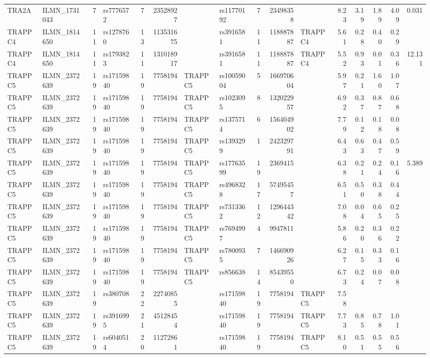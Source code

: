\documentclass{article}
\begin{document}
\begin{landscape}
{\begin{ThreePartTable}
\begin{longtable}{|llr|lrrl|lrrl|rrrr|r|}
TRA2A & ILMN\_1731043 & 7 & rs7776572 & 7 & 23528927 &  & rs11770192 & 7 & 23498358 &  & 8.23 & 3.19 & 1.89 & 4.09 & 0.031 \\
TRAPPC4 & ILMN\_1814650 & 11 & rs1278760 & 13 & 113531675 &  & rs3916581 & 11 & 118887887 & TRAPPC4 & 5.61 & 0.28 & 0.40 & 0.29 &  \\
TRAPPC4 & ILMN\_1814650 & 11 & rs1793823 & 11 & 131018917 &  & rs3916581 & 11 & 118887887 & TRAPPC4 & 5.52 & 0.93 & 0.01 & 0.36 & 12.131 \\
TRAPPC5 & ILMN\_2372639 & 19 & rs17159840 & 19 & 7758194 & TRAPPC5 & rs10059004 & 5 & 166970604 &  & 5.97 & 0.21 & 1.60 & 1.07 &  \\
TRAPPC5 & ILMN\_2372639 & 19 & rs17159840 & 19 & 7758194 & TRAPPC5 & rs1023095 & 8 & 132022957 &  & 6.92 & 0.37 & 0.87 & 0.68 &  \\
TRAPPC5 & ILMN\_2372639 & 19 & rs17159840 & 19 & 7758194 & TRAPPC5 & rs1375714 & 6 & 156404902 &  & 7.79 & 0.12 & 0.18 & 0.08 &  \\
TRAPPC5 & ILMN\_2372639 & 19 & rs17159840 & 19 & 7758194 & TRAPPC5 & rs1393299 & 1 & 242329791 &  & 6.43 & 0.63 & 0.47 & 0.59 &  \\
TRAPPC5 & ILMN\_2372639 & 19 & rs17159840 & 19 & 7758194 & TRAPPC5 & rs17763599 & 19 & 2369415 &  & 6.38 & 0.21 & 0.24 & 0.16 & 5.389 \\
TRAPPC5 & ILMN\_2372639 & 19 & rs17159840 & 19 & 7758194 & TRAPPC5 & rs4968328 & 17 & 57495457 &  & 6.51 & 0.50 & 0.38 & 0.44 &  \\
TRAPPC5 & ILMN\_2372639 & 19 & rs17159840 & 19 & 7758194 & TRAPPC5 & rs7313362 & 12 & 129644342 &  & 7.08 & 0.04 & 0.65 & 0.25 &  \\
TRAPPC5 & ILMN\_2372639 & 19 & rs17159840 & 19 & 7758194 & TRAPPC5 & rs7694997 & 4 & 9947811 &  & 5.86 & 0.20 & 0.36 & 0.22 &  \\
TRAPPC5 & ILMN\_2372639 & 19 & rs17159840 & 19 & 7758194 & TRAPPC5 & rs7800935 & 7 & 146690926 &  & 6.27 & 0.15 & 0.33 & 0.16 &  \\
TRAPPC5 & ILMN\_2372639 & 19 & rs17159840 & 19 & 7758194 & TRAPPC5 & rs856638 & 14 & 85439550 &  & 6.73 & 0.24 & 0.07 & 0.08 &  \\
TRAPPC5 & ILMN\_2372639 & 19 & rs380708 & 22 & 22740855 &  & rs17159840 & 19 & 7758194 & TRAPPC5 & 7.58 &  &  &  &  \\
TRAPPC5 & ILMN\_2372639 & 19 & rs3916995 & 21 & 45128454 &  & rs17159840 & 19 & 7758194 & TRAPPC5 & 7.73 & 0.85 & 0.78 & 1.01 &  \\
TRAPPC5 & ILMN\_2372639 & 19 & rs6040514 & 20 & 11272861 &  & rs17159840 & 19 & 7758194 & TRAPPC5 & 8.10 & 0.51 & 0.55 & 0.56 &  \\

\end{longtable}
\end{ThreePartTable}}
\end{landscape}
\end{document}
